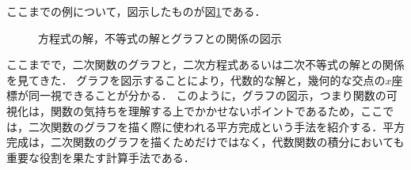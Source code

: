 ここまでの例について，図示したものが図\ref{fig:equation}である．

\vfill
\begin{figure}[!h]
	\caption{方程式の解，不等式の解とグラフとの関係の図示}
	\label{fig:equation}
\end{figure}
\clearpage

ここまでで，二次関数のグラフと，二次方程式あるいは二次不等式の解との関係を見てきた．
グラフを図示することにより，代数的な解と，幾何的な交点の$x$座標が同一視できることが分かる．
このように，グラフの図示，つまり関数の可視化は，関数の気持ちを理解する上でかかせないポイントであるため，ここでは，二次関数のグラフを描く際に使われる平方完成という手法を紹介する．平方完成は，二次関数のグラフを描くためだけではなく，代数関数の積分においても重要な役割を果たす計算手法である．


